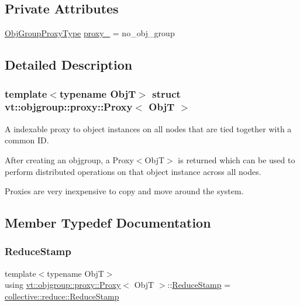 \subsection*{Private Attributes}
\begin{DoxyCompactItemize}
\item 
\hyperlink{namespacevt_ad7cae989df485fccca57f0792a880a8e}{Obj\+Group\+Proxy\+Type} \hyperlink{structvt_1_1objgroup_1_1proxy_1_1_proxy_a4411a5c2a4719d264060041fd15d9d03}{proxy\+\_\+} = no\+\_\+obj\+\_\+group
\end{DoxyCompactItemize}


\subsection{Detailed Description}
\subsubsection*{template$<$typename ObjT$>$\newline
struct vt\+::objgroup\+::proxy\+::\+Proxy$<$ Obj\+T $>$}

A indexable proxy to object instances on all nodes that are tied together with a common ID. 

After creating an objgroup, a Proxy$<$\+Obj\+T$>$ is returned which can be used to perform distributed operations on that object instance across all nodes.

Proxies are very inexpensive to copy and move around the system. 

\subsection{Member Typedef Documentation}
\mbox{\label{structvt_1_1objgroup_1_1proxy_1_1_proxy_a337be4c20cf11ff6477c7a66208cc909}} 
\subsubsection{\texorpdfstring{Reduce\+Stamp}{ReduceStamp}}
{\footnotesize\ttfamily template$<$typename ObjT$>$ \\
using \hyperlink{structvt_1_1objgroup_1_1proxy_1_1_proxy}{vt\+::objgroup\+::proxy\+::\+Proxy}$<$ ObjT $>$\+::\hyperlink{structvt_1_1objgroup_1_1proxy_1_1_proxy_a337be4c20cf11ff6477c7a66208cc909}{Reduce\+Stamp} =  \hyperlink{namespacevt_1_1collective_1_1reduce_a7b7cb3021ac5654d92825d9fab0250b2}{collective\+::reduce\+::\+Reduce\+Stamp}}



